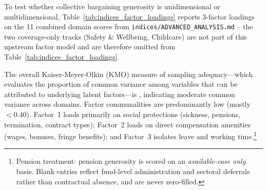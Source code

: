 To test whether collective bargaining generosity is unidimensional or multidimensional, Table~\ref{tab:indices_factor_loadings} reports 3-factor loadings on the 11 combined domain scores from \texttt{indices/ADVANCED\_ANALYSIS.md} -- the two coverage-only tracks (Safety \& Wellbeing, Childcare) are not part of this upstream factor model and are therefore omitted from Table~\ref{tab:indices_factor_loadings}.
\begin{table}[H]
    \centering
    \caption{Three-factor loadings on combined domain generosity scores}
    \label{tab:indices_factor_loadings}
    
\end{table}
The overall Kaiser-Meyer-Olkin (KMO) measure of sampling adequacy---which evaluates the proportion of common variance among variables that can be attributed to underlying latent factors---is \IndKmoStat, indicating moderate common variance across domains. Factor communalities are predominantly low (mostly $<0.40$). Factor~1 loads primarily on social protections (sickness, pensions, termination, contract types); Factor~2 loads on direct compensation amenities (wages, bonuses, fringe benefits); and Factor~3 isolates leave and working time.\footnote{Pension treatment: pension generosity is scored on an \emph{available-case only} basis. Blank entries reflect fund-level administration and sectoral deferrals rather than contractual absence, and are never zero-filled.}